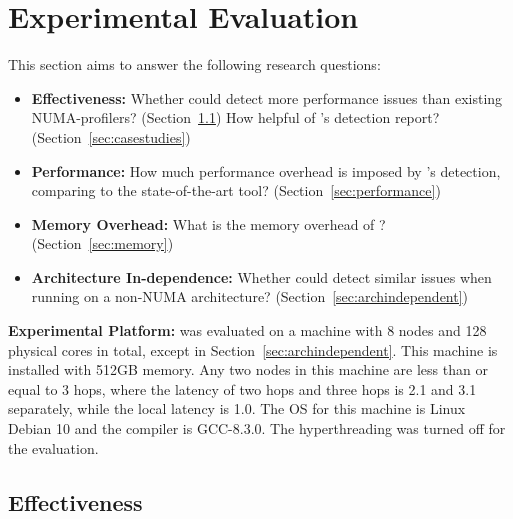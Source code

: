 \section{Experimental Evaluation}
\label{sec:evaluation}

This section aims to answer the following research questions: 

\begin{itemize}
\item \textbf{Effectiveness:} Whether \NP{} could detect more performance issues than existing NUMA-profilers? (Section~\ref{effectiveness}) How helpful of \NP{}'s detection report? (Section~\ref{sec:casestudies})
\item \textbf{Performance:} How much performance overhead is imposed by \NP{}'s detection, comparing to the state-of-the-art tool? (Section~\ref{sec:performance}) 
\item \textbf{Memory Overhead:} What is the memory overhead of \NP{}? (Section~\ref{sec:memory})
\item \textbf{Architecture In-dependence:} Whether \NP{} could detect similar issues when running on a non-NUMA architecture? (Section~\ref{sec:archindependent})	
\end{itemize}


\textbf{Experimental Platform:}  \NP{} was evaluated on a machine with 8 nodes and 128 physical cores in total, except in Section~\ref{sec:archindependent}. This machine is installed with 512GB memory. Any two nodes in this machine are less than or equal to 3 hops, where the latency of two hops and three hops is 2.1 and 3.1 separately, while the local latency is 1.0. The OS for this machine is Linux Debian 10 and the compiler is GCC-8.3.0. The hyperthreading was turned off for the evaluation. 


\subsection{Effectiveness}
\label{effectiveness}
%



